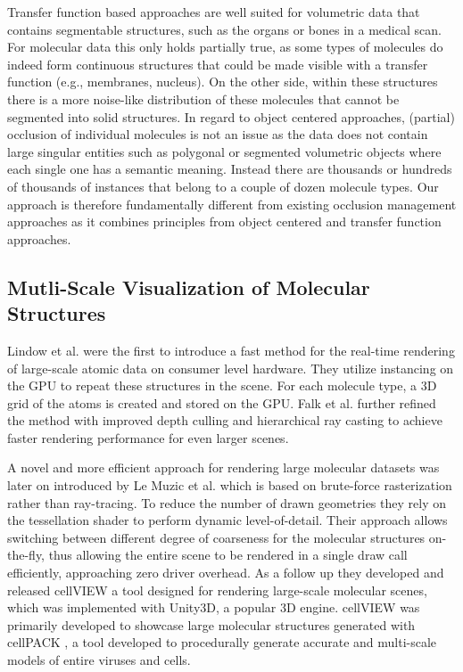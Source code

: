 Transfer function based approaches are well suited for volumetric data that contains segmentable structures, such as the organs or bones in a medical scan. For molecular data this only holds partially true, as some types of molecules do indeed form continuous structures that could be made visible with a transfer function (e.g., membranes, nucleus). On the other side, within these structures there is a more noise-like distribution of these molecules that cannot be segmented into solid structures. 
In regard to object centered approaches, (partial) occlusion of individual molecules is not an issue as the data does not contain large singular entities such as polygonal or segmented volumetric objects where each single one has a semantic meaning. Instead there are thousands or hundreds of thousands of instances that belong to a couple of dozen molecule types.
Our approach is therefore fundamentally different from existing occlusion management approaches as it combines principles from object centered and transfer function approaches. 


\subsection{Mutli-Scale Visualization of Molecular Structures}
Lindow et al. \cite{lindow15} were the first to introduce a fast method for the real-time rendering of large-scale atomic data on consumer level hardware. They utilize instancing on the GPU to repeat these structures in the scene. For each molecule type, a 3D grid of the atoms is created and stored on the GPU. Falk et al. \cite{falk13} further refined the method with improved depth culling and hierarchical ray casting to achieve faster rendering performance for even larger scenes. 

A novel and more efficient approach for rendering large molecular datasets was later on introduced by Le Muzic et al. \cite{le2014illustrative} which is based on brute-force rasterization rather than ray-tracing. To reduce the number of drawn geometries they rely on the tessellation shader to perform dynamic level-of-detail. Their approach allows switching between different degree of coarseness for the molecular structures on-the-fly, thus allowing the entire scene to be rendered in a single draw call efficiently, approaching zero driver overhead. As a follow up they developed and released cellVIEW \cite{muzic15} a tool designed for rendering large-scale molecular scenes, which was implemented with Unity3D, a popular 3D engine. cellVIEW was primarily developed to showcase large molecular structures generated with cellPACK \cite{cellpack}, a tool developed to procedurally generate accurate and multi-scale models of entire viruses and cells.

